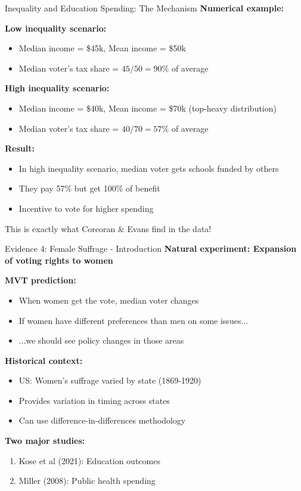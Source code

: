 \documentclass[10pt]{beamer}
\begin{document}
\begin{frame}{Inequality and Education Spending: The Mechanism}
\textbf{Numerical example:}


\textbf{Low inequality scenario:}
\begin{itemize}
\item Median income = \$45k, Mean income = \$50k
\item Median voter's tax share = $45/50 = 90\%$ of average
\end{itemize}



\textbf{High inequality scenario:}
\begin{itemize}
\item Median income = \$40k, Mean income = \$70k (top-heavy distribution)
\item Median voter's tax share = $40/70 = 57\%$ of average
\end{itemize}



\textbf{Result:}
\begin{itemize}
\item In high inequality scenario, median voter gets schools funded by others
\item They pay 57\% but get 100\% of benefit
\item \alert{Incentive to vote for higher spending}
\end{itemize}



This is exactly what Corcoran \& Evans find in the data!
\end{frame}

\begin{frame}{Evidence 4: Female Suffrage - Introduction}
\textbf{Natural experiment: Expansion of voting rights to women}



\textbf{MVT prediction:}
\begin{itemize}
\item When women get the vote, median voter changes
\item If women have different preferences than men on some issues...
\item ...we should see policy changes in those areas
\end{itemize}



\textbf{Historical context:}
\begin{itemize}
\item US: Women's suffrage varied by state (1869-1920)
\item Provides variation in timing across states
\item Can use difference-in-differences methodology
\end{itemize}



\textbf{Two major studies:}
\begin{enumerate}
\item Kose et al (2021): Education outcomes
\item Miller (2008): Public health spending
\end{enumerate}
\end{frame}
\end{document}
